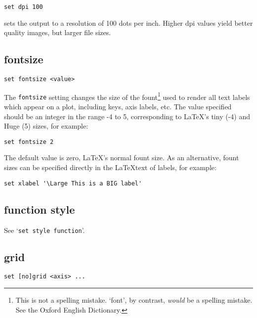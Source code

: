 \documentclass[a4paper,onecolumn,11pt]{book}
\begin{document}
\begin{verbatim}
set dpi 100
\end{verbatim}

\noindent sets the output to a resolution of 100 dots per inch. Higher dpi
values yield better quality images, but larger file sizes.

\subsection{fontsize}

\begin{verbatim}
set fontsize <value>
\end{verbatim}

The {\tt fontsize} setting changes the size of the fount\footnote{This is not a
spelling mistake. `font', by contrast, \textit{would} be a spelling mistake. See the
Oxford English Dictionary.} used to render all text labels which appear on a
plot, including keys, axis labels, etc. The value specified should be an integer
in the range -4 to 5, corresponding to \LaTeX's tiny (-4) and Huge (5) sizes,
for example:

\begin{verbatim}
set fontsize 2
\end{verbatim}

The default value is zero, \LaTeX's normal fount size. As an alternative, fount
sizes can be specified directly in the \LaTeX text of labels, for example:

\begin{verbatim}
set xlabel '\Large This is a BIG label'
\end{verbatim}

\subsection{function style}

See `{\tt set style function}'.

\subsection{grid}

\begin{verbatim}
set [no]grid <axis> ...
\end{verbatim}
\end{document}
